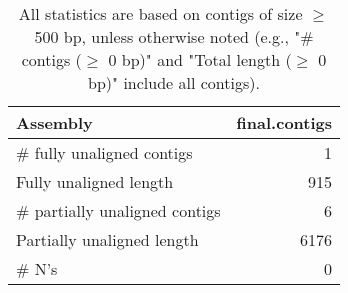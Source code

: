 \documentclass[12pt,a4paper]{article}
\begin{document}
\begin{table}[ht]
\begin{center}
\caption{All statistics are based on contigs of size $\geq$ 500 bp, unless otherwise noted (e.g., "\# contigs ($\geq$ 0 bp)" and "Total length ($\geq$ 0 bp)" include all contigs).}
\begin{tabular}{|l*{1}{|r}|}
\hline
Assembly & final.contigs \\ \hline
\# fully unaligned contigs & 1 \\ \hline
Fully unaligned length & 915 \\ \hline
\# partially unaligned contigs & 6 \\ \hline
Partially unaligned length & 6176 \\ \hline
\# N's & 0 \\ \hline
\end{tabular}
\end{center}
\end{table}
\end{document}
